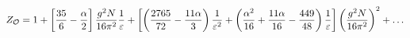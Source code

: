 \begin{equation}
Z_{\mathcal{O}}=1+\left[ \frac{35}{6}-\frac{\alpha }{2}\right]\frac{g ^{2}N}{%
16\pi ^{2}}\frac{1}{\varepsilon }+\left[\left(\frac{2765}{72}-\frac{11\alpha%
}{3}\right)\frac{1}{\varepsilon^{2}} +\left(\frac{\alpha^{2}}{16}+\frac{%
11\alpha}{16}-\frac{449}{48}\right)\frac{1}{\varepsilon}\right]\left(\frac{%
g^{2}N}{16\pi^{2}}\right)^{2}+\ldots  \label{zo}
\end{equation}

